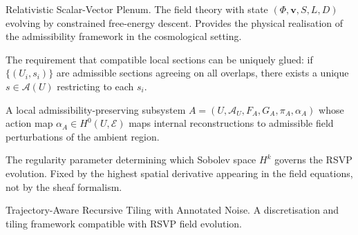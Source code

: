 \begin{description}[leftmargin=2.5cm, style=nextline]
\item[RSVP]
  Relativistic Scalar-Vector Plenum.
  The field theory with state $(\Phi, \mathbf{v}, S, L, D)$
  evolving by constrained free-energy descent.
  Provides the physical realisation of the admissibility
  framework in the cosmological setting.

\item[Sheaf condition]
  The requirement that compatible local sections can be uniquely
  glued: if $\{(U_i, s_i)\}$ are admissible sections agreeing
  on all overlaps, there exists a unique $s \in \mathcal{A}(U)$
  restricting to each $s_i$.

\item[Simulated Agency]
  A local admissibility-preserving subsystem $A = (U, \mathcal{A}_U,
  F_A, G_A, \pi_A, \alpha_A)$ whose action map $\alpha_A \in
  H^0(U, \mathcal{E})$ maps internal reconstructions to
  admissible field perturbations of the ambient region.

\item[Sobolev index $k$]
  The regularity parameter determining which Sobolev space
  $H^k$ governs the RSVP evolution.
  Fixed by the highest spatial derivative appearing in the
  field equations, not by the sheaf formalism.

\item[TARTAN]
  Trajectory-Aware Recursive Tiling with Annotated Noise.
  A discretisation and tiling framework compatible with RSVP
  field evolution.

\end{description}

